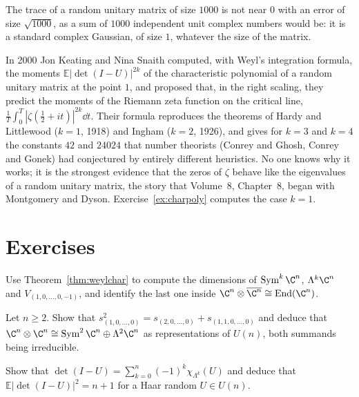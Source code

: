 The trace of a random unitary matrix of size $1000$ is not near $0$ with an error of size $\sqrt{1000}$, as a sum of $1000$ independent unit complex numbers would be: it is a standard complex Gaussian, of size $1$, whatever the size of the matrix.

\begin{beauty}
In 2000 Jon Keating and Nina Snaith computed, with Weyl's integration formula, the moments $\mathbb E|\det(I-U)|^{2k}$ of the characteristic polynomial of a random unitary matrix at the point $1$, and proposed that, in the right scaling, they predict the moments of the
Riemann zeta function on the critical line, $\frac1T\int_0^T|\zeta(\frac12+it)|^{2k}\dd t$. Their formula reproduces the theorems of Hardy and Littlewood ($k=1$, 1918) and Ingham ($k=2$, 1926), and gives for $k=3$ and $k=4$ the constants $42$ and $24024$ that number theorists
(Conrey and Ghosh, Conrey and Gonek) had conjectured by entirely different heuristics. No one knows why it works; it is the strongest evidence that the zeros of $\zeta$ behave like the eigenvalues of a random unitary matrix, the
story that Volume~8, Chapter~8, began with Montgomery and Dyson. Exercise~\ref{ex:charpoly} computes the case $k=1$.
\end{beauty}

\section{Exercises}

\begin{exercise}[$\star$]\label{ex:dims}
Use Theorem~\ref{thm:weylchar} to compute the dimensions of $\operatorname{Sym}^k\C^n$, $\Lambda^k\C^n$ and $V_{(1,0,\dots,0,-1)}$, and identify the last one inside $\C^n\otimes\overline{\C^n}\cong\operatorname{End}(\C^n)$.
\end{exercise}

\begin{exercise}[$\star$]\label{ex:tensorsquare}
Let $n\ge2$.
Show that $s_{(1,0,\dots,0)}^2=s_{(2,0,\dots,0)}+s_{(1,1,0,\dots,0)}$ and deduce that $\C^n\otimes\C^n\cong\operatorname{Sym}^2\C^n\oplus\Lambda^2\C^n$ as representations of $U(n)$, both summands being irreducible.
\end{exercise}

\begin{exercise}[$\star\star$]\label{ex:charpoly}
Show that $\det(I-U)=\sum_{k=0}^n(-1)^k\chi_{\Lambda^k}(U)$ and deduce that $\mathbb E|\det(I-U)|^2=n+1$ for a Haar random $U\in U(n)$.
\end{exercise}

